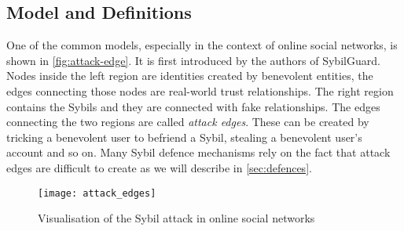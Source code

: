 
\subsection{Model and Definitions}
One of the common models, especially in the context of online social networks,
is shown in \autoref{fig:attack-edge}. It is first introduced by the authors of
SybilGuard\cite{yu2006sybilguard}. Nodes inside the left region are identities
created by benevolent entities, the edges connecting those nodes are real-world
trust relationships. The right region contains the Sybils and they are connected
with fake relationships. The edges connecting the two regions are called
\emph{attack edges}. These can be created by tricking a benevolent user to befriend
a Sybil, stealing a benevolent user's account and so on. Many Sybil defence
mechanisms rely on the fact that attack edges are difficult to create as we will
describe in \autoref{sec:defences}.

\begin{figure}
  \centering
  \texttt{[image: attack\_edges]}
  \caption{Visualisation of the Sybil attack in online social networks}
  \label{fig:attack-edge}
\end{figure}


